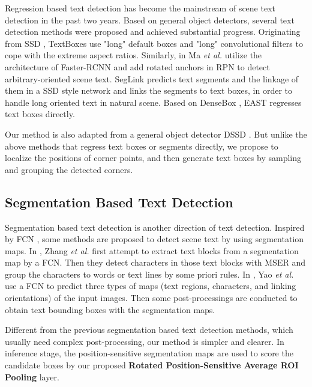 \documentclass[10pt,twocolumn,letterpaper]{article}
\begin{document}
Regression based text detection has become the mainstream of scene text detection in the past two years. Based on general object detectors, several text detection methods were proposed and achieved substantial progress. Originating from SSD \cite{liu2016ssd}, TextBoxes \cite{liao2017textboxes} use "long" default boxes and "long" convolutional filters to cope with the extreme aspect ratios. Similarly, in \cite{ma2017arbitrary} Ma \emph{et al.} utilize the architecture of Faster-RCNN \cite{ren2015faster} and add rotated anchors in RPN to detect arbitrary-oriented scene text. SegLink \cite{Shi_2017_CVPR} predicts text segments and the linkage of them in a SSD style network and links the segments to text boxes, in order to handle long oriented text in natural scene. Based on DenseBox \cite{huang2015densebox}, EAST \cite{Zhou_2017_CVPR} regresses text boxes directly.

Our method is also adapted from a general object detector DSSD \cite{fu2017dssd}. But unlike the above methods that regress text boxes or segments directly, we propose to localize the positions of corner points, and then generate text boxes by sampling and grouping the detected corners.

\subsection{Segmentation Based Text Detection}

Segmentation based text detection is another direction of text detection. Inspired by FCN \cite{long2015fully}, some methods are proposed to detect scene text by using segmentation maps. In \cite{zhang2016multi}, Zhang \emph{et al.} first attempt to extract text blocks from a segmentation map by a FCN. Then they detect characters in those text blocks with MSER \cite{neumann2010method} and group the characters to words or text lines by some priori rules. In \cite{yao2016scene}, Yao \emph{et al.} use a FCN to predict three types of maps (text regions, characters, and linking orientations) of the input images. Then some post-processings are conducted to obtain text bounding boxes with the segmentation maps.

Different from the previous segmentation based text detection methods, which usually need complex post-processing, our method is simpler and clearer. In inference stage, the position-sensitive segmentation maps are used to score the candidate boxes by our proposed \textbf{Rotated Position-Sensitive Average ROI Pooling} layer.
\end{document}
